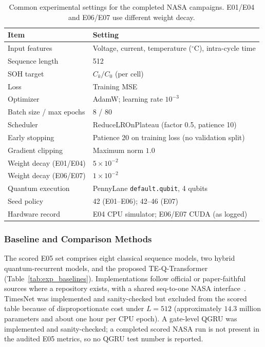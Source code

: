 \begin{table}[t]
\caption{Common experimental settings for the completed NASA campaigns. E01/E04 and E06/E07 use different weight decay.}\label{tab:exp_settings}
\begin{tabular*}{\tblwidth}{@{}LL@{}}
\toprule
Item & Setting \\
\midrule
Input features & Voltage, current, temperature ($^\circ$C), intra-cycle time \\
Sequence length & 512 \\
SOH target & $C_k/C_0$ (per cell) \\
Loss & Training MSE \\
Optimizer & AdamW; learning rate $10^{-3}$ \\
Batch size / max epochs & 8 / 80 \\
Scheduler & ReduceLROnPlateau (factor 0.5, patience 10) \\
Early stopping & Patience 20 on training loss (no validation split) \\
Gradient clipping & Maximum norm $1.0$ \\
Weight decay (E01/E04) & $5\times10^{-2}$ \\
Weight decay (E06/E07) & $1\times10^{-2}$ \\
Quantum execution & PennyLane \mbox{\texttt{default.qubit}}, 4 qubits \\
Seed policy & 42 (E01--E06); 42--46 (E07) \\
Hardware record & E04 CPU simulator; E06/E07 CUDA (as logged) \\
\bottomrule
\end{tabular*}
\end{table}

\subsubsection{Baseline and Comparison Methods}
\label{sec:baseline_comparison}

The scored E05 set comprises eight classical sequence models, two hybrid quantum-recurrent models, and the proposed TE-Q-Transformer (Table~\ref{tab:exp_baselines}). Implementations follow official or paper-faithful sources where a repository exists, with a shared seq-to-one NASA interface~\citep{wang2024state,zhang2023accurate,giuliano2025transformer,soon2025hybrid,wang2026prediction}. TimesNet was implemented and sanity-checked but excluded from the scored table because of disproportionate cost under $L=512$ (approximately $14.3$ million parameters and about one hour per CPU epoch). A gate-level QGRU was implemented and sanity-checked; a completed scored NASA run is not present in the audited E05 metrics, so no QGRU test number is reported.

